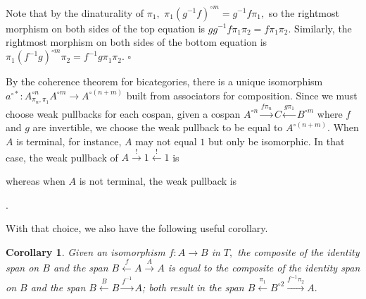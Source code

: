 \documentclass{article}
\newcommand{\maps}{\colon}
\newtheorem{cor}[thm]{Corollary}
\begin{document}
Note that by the dinaturality of $\pi_1,$ $\pi_1 (g^{-1}f)^{\circ m} = g^{-1}f \pi_1,$ so the rightmost morphism on both sides of the top equation is $g g^{-1}f \pi_1 \pi_2 = f \pi_1\pi_2.$  Similarly, the rightmost morphism on both sides of the bottom equation is $\pi_1 (f^{-1}g)^{\circ m} \pi_2 = f^{-1}g \pi_1 \pi_2.$ \hfill $\square$

By the coherence theorem for bicategories, there is a unique isomorphism $a^{\circ *}\maps A^{\circ n}_{\pi_n,\pi_1}A^{\circ m} \to A^{\circ (n+m)}$ built from associators for composition.  Since we must choose weak pullbacks for each cospan, given a cospan $A^{\circ n} \stackrel{f\pi_n}{\to} C \stackrel{g\pi_1}{\leftarrow} B^{\circ m}$ where $f$ and $g$ are invertible, we choose the weak pullback to be equal to $A^{\circ (n+m)}.$  When $A$ is terminal, for instance, $A$ may not equal $1$ but only be isomorphic.  In that case, the weak pullback of $A \stackrel{!}{\to} 1 \stackrel{!}{\leftarrow} 1$ is
\begin{center}
\end{center}
whereas when $A$ is not terminal, the weak pullback is
\begin{center}
  .
\end{center}

With that choice, we also have the following useful corollary.
\begin{cor}
  \label{reverse}
  Given an isomorphism $f\maps A \to B$ in $T,$ the composite of the identity span on $B$ and the span $B \stackrel{f}{\leftarrow} A \stackrel{A}{\to} A$ is equal to the composite of the identity span on $B$ and the span $B \stackrel{B}{\leftarrow} B \stackrel{f^{-1}}{\to} A$; both result in the span $B \stackrel{\pi_1}{\leftarrow} B^{\circ 2} \stackrel{f^{-1}\pi_2}{\to} A.$
\end{cor}
\end{document}
